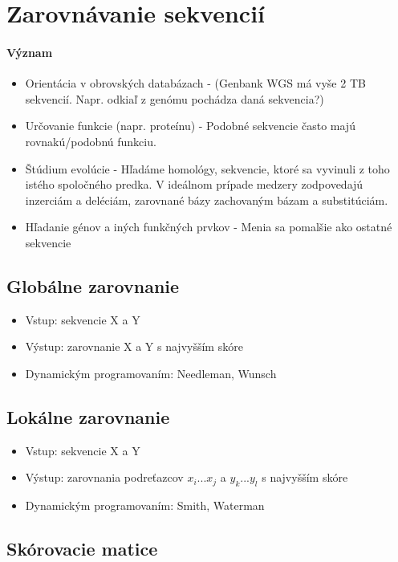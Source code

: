 	\section{Zarovnávanie sekvencií}
		\paragraph{Význam}
			\begin{itemize}
				\item Orientácia v obrovských databázach - (Genbank WGS má vyše 2 TB sekvencií. Napr. odkiaľ z genómu pochádza daná sekvencia?)
				\item Určovanie funkcie (napr. proteínu) - Podobné sekvencie často majú rovnakú/podobnú funkciu.
				\item Štúdium evolúcie - Hľadáme homológy, sekvencie, ktoré sa vyvinuli z toho istého spoločného predka. V ideálnom prípade medzery zodpovedajú inzerciám a deléciám, zarovnané bázy zachovaným bázam a substitúciám.
				\item Hľadanie génov a iných funkčných prvkov - Menia sa pomalšie ako ostatné sekvencie
			\end{itemize}

		\subsection{Globálne zarovnanie}
			\begin{itemize}
					\item Vstup: sekvencie X a Y
					\item Výstup: zarovnanie X a Y s najvyšším skóre
					\item Dynamickým programovaním: Needleman, Wunsch
			\end{itemize}

		\subsection{Lokálne zarovnanie}
			\begin{itemize}
				\item Vstup: sekvencie X a Y
				\item Výstup: zarovnania podreťazcov $x_{i} . . . x_{j}$ a $y_{k} . . . y_{l}$ s najvyšším skóre
				\item Dynamickým programovaním: Smith, Waterman
			\end{itemize}

		\subsection{Skórovacie matice}


